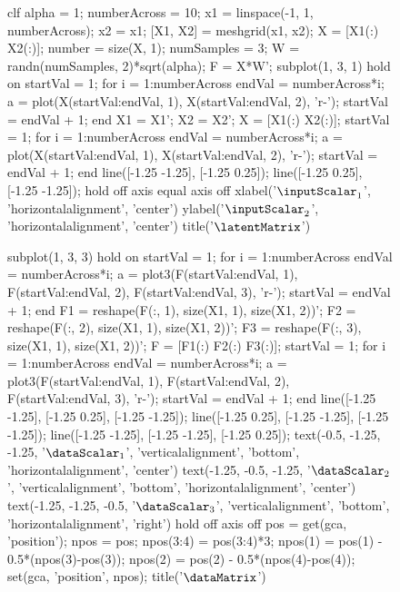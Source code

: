\begin{figure}
  \begin{matlab}
    clf
    alpha = 1;
    numberAcross = 10;
    x1 = linspace(-1, 1, numberAcross);
    x2 = x1;
    [X1, X2] = meshgrid(x1, x2);
    X = [X1(:) X2(:)];
    number = size(X, 1);
    numSamples = 3;
    W = randn(numSamples, 2)*sqrt(alpha);
    F = X*W';
    subplot(1, 3, 1)
    hold on
    startVal = 1;
    for i = 1:numberAcross
      endVal = numberAcross*i;
      a = plot(X(startVal:endVal, 1), X(startVal:endVal, 2), 'r-');
      startVal = endVal + 1;
    end
    X1 = X1';
    X2 = X2';
    X = [X1(:) X2(:)];
    startVal = 1;
    for i = 1:numberAcross
      endVal = numberAcross*i;
      a = plot(X(startVal:endVal, 1), X(startVal:endVal, 2), 'r-');
      startVal = endVal + 1;
    end
    line([-1.25 -1.25], [-1.25 0.25]);
    line([-1.25 0.25], [-1.25 -1.25]);
    hold off
    axis equal
    axis off
    xlabel('$\inputScalar_1$', 'horizontalalignment', 'center')
    ylabel('$\inputScalar_2$', 'horizontalalignment', 'center')
    title('$\latentMatrix$')
    
    subplot(1, 3, 3)
    hold on
    startVal = 1;
    for i = 1:numberAcross
      endVal = numberAcross*i;
      a = plot3(F(startVal:endVal, 1), F(startVal:endVal, 2), F(startVal:endVal, 3), 'r-');
      startVal = endVal + 1;
    end
    F1 = reshape(F(:, 1), size(X1, 1), size(X1, 2))';
    F2 = reshape(F(:, 2), size(X1, 1), size(X1, 2))';
    F3 = reshape(F(:, 3), size(X1, 1), size(X1, 2))';
    F = [F1(:) F2(:) F3(:)];
    startVal = 1;
    for i = 1:numberAcross
      endVal = numberAcross*i;
      a = plot3(F(startVal:endVal, 1), F(startVal:endVal, 2), F(startVal:endVal, 3), 'r-');
      startVal = endVal + 1;
    end
    line([-1.25 -1.25], [-1.25 0.25], [-1.25 -1.25]);
    line([-1.25 0.25], [-1.25 -1.25], [-1.25 -1.25]);
    line([-1.25 -1.25], [-1.25 -1.25], [-1.25 0.25]);
    text(-0.5, -1.25, -1.25, '$\dataScalar_1$', 'verticalalignment', 'bottom', 'horizontalalignment', 'center')
    text(-1.25, -0.5, -1.25, '$\dataScalar_2$', 'verticalalignment', 'bottom', 'horizontalalignment', 'center')
    text(-1.25, -1.25, -0.5, '$\dataScalar_3$', 'verticalalignment', 'bottom', 'horizontalalignment', 'right')
    hold off
    axis off
    pos = get(gca, 'position');
    npos = pos;
    npos(3:4) = pos(3:4)*3;
    npos(1) = pos(1) - 0.5*(npos(3)-pos(3));
    npos(2) = pos(2) - 0.5*(npos(4)-pos(4));
    set(gca, 'position', npos);
    title('$\dataMatrix$')


\end{matlab}
\end{figure}
